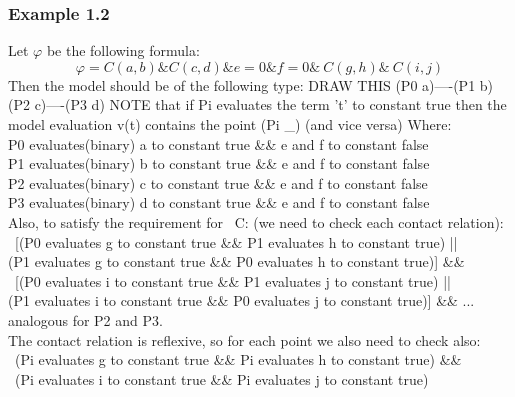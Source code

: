 \documentclass{article}
\begin{document}
			\subsubsection*{Example 1.2}
				Let $\varphi$ be the following formula:
				\begin{equation*}
					\varphi = C(a,b) \& C(c,d) \& e=0 \& f=0 \& ~C(g,h) \& ~C(i, j)
				\end{equation*}
				Then the model should be of the following type:
				\newline
				DRAW THIS
				(P0 a)----(P1 b)
				(P2 c)----(P3 d)
				\newline
				NOTE that if Pi evaluates the term 't' to constant true then the model 
				evaluation v(t) contains the point (Pi \_) (and vice versa)
				\newline
				Where: \\
				P0 evaluates(binary) a to constant true \&\& e and f to constant false \\
			      P1 evaluates(binary) b to constant true \&\& e and f to constant false \\ 
				P2 evaluates(binary) c to constant true \&\& e and f to constant false \\ 
			      P3 evaluates(binary) d to constant true \&\& e and f to constant false \\ 
				Also, to satisfy the requirement for ~C: (we need to check each contact relation): \\
				~[(P0 evaluates g to constant true \&\& P1 evaluates h to constant true) || \\
				(P1 evaluates g to constant true \&\& P0 evaluates h to constant true)] \&\& \\
				~[(P0 evaluates i to constant true \&\& P1 evaluates j to constant true) || \\
				(P1 evaluates i to constant true \&\& P0 evaluates j to constant true)] \&\& ... analogous for P2 and P3. \\
				\newline
				The contact relation is reflexive, so for each point we also need to check also:	\\
				~(Pi evaluates g to constant true \&\& Pi evaluates h to constant true) \&\& \\
				~(Pi evaluates i to constant true \&\& Pi evaluates j to constant true)
\end{document}
